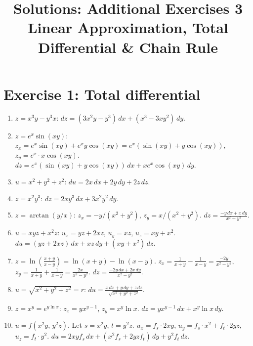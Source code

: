 \documentclass[12pt,a4paper]{article}
\title{\textbf{Solutions: Additional Exercises 3}\\
\large Linear Approximation, Total Differential \& Chain Rule}
\date{}
\begin{document}
\maketitle
\thispagestyle{empty}

\section*{Exercise 1: Total differential}

\begin{enumerate}[leftmargin=*, label=(\alph*)]

\item $z=x^3y-y^3x$: $dz=(3x^2y-y^3)\,dx+(x^3-3xy^2)\,dy$.

\item $z=e^x\sin(xy)$: $z_x=e^x\sin(xy)+e^x y\cos(xy)=e^x(\sin(xy)+y\cos(xy))$,
$z_y=e^x\cdot x\cos(xy)$.
$dz=e^x(\sin(xy)+y\cos(xy))\,dx+xe^x\cos(xy)\,dy$.

\item $u=x^2+y^2+z^2$: $du=2x\,dx+2y\,dy+2z\,dz$.

\item $z=x^2y^3$: $dz=2xy^3\,dx+3x^2y^2\,dy$.

\item $z=\arctan(y/x)$: $z_x=-y/(x^2+y^2)$, $z_y=x/(x^2+y^2)$.
$dz=\frac{-y\,dx+x\,dy}{x^2+y^2}$.

\item $u=xyz+x^2z$: $u_x=yz+2xz$, $u_y=xz$, $u_z=xy+x^2$.
$du=(yz+2xz)\,dx+xz\,dy+(xy+x^2)\,dz$.

\item $z=\ln\!\left(\frac{x+y}{x-y}\right)=\ln(x+y)-\ln(x-y)$.
$z_x=\frac{1}{x+y}-\frac{1}{x-y}=\frac{-2y}{x^2-y^2}$,\quad $z_y=\frac{1}{x+y}+\frac{1}{x-y}=\frac{2x}{x^2-y^2}$.
$dz=\frac{-2y\,dx+2x\,dy}{x^2-y^2}$.

\item $u=\sqrt{x^2+y^2+z^2}=r$: $du=\frac{x\,dx+y\,dy+z\,dz}{\sqrt{x^2+y^2+z^2}}$.

\item $z=x^y=e^{y\ln x}$: $z_x=y x^{y-1}$, $z_y=x^y\ln x$.
$dz=yx^{y-1}\,dx+x^y\ln x\,dy$.

\item $u=f(x^2y,\,y^2z)$. Let $s=x^2y$, $t=y^2z$.
$u_x=f_s\cdot 2xy$, $u_y=f_s\cdot x^2+f_t\cdot 2yz$, $u_z=f_t\cdot y^2$.
$du=2xy f_s\,dx+(x^2 f_s+2yz f_t)\,dy+y^2 f_t\,dz$.

\end{enumerate}
\end{document}
